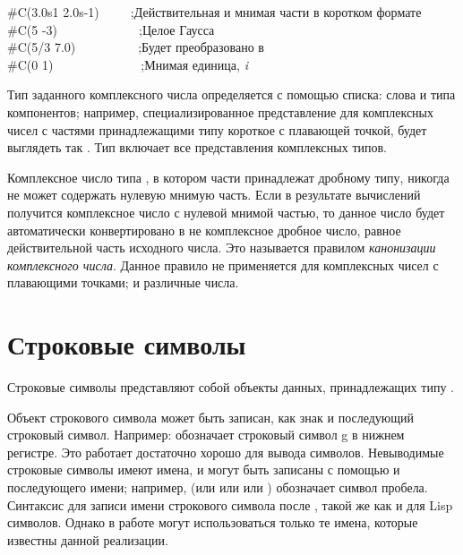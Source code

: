 \begin{lisp}
\#C(3.0s1 2.0s-1)~~~~~;\textrm{Действительная и мнимая части в коротком формате}\\
\#C(5 -3)~~~~~~~~~~~~~;\textrm{Целое Гаусса} \\
\#C(5/3 7.0)~~~~~~~~~~;\textrm{Будет преобразовано в } \\
\#C(0 1)~~~~~~~~~~~~~~;\textrm{Мнимая единица, \emph{i}}
\end{lisp}

Тип заданного комплексного числа определяется с помощью списка: слова
 и типа компонентов; например, специализированное представление для
комплексных чисел с частями принадлежащими типу короткое с плавающей точкой,
будет выглядеть так . Тип  включает все
представления комплексных типов.

Комплексное число типа , в котором части принадлежат
дробному типу, никогда не может содержать нулевую мнимую часть. Если в
результате вычислений получится комплексное число с нулевой мнимой частью, то
данное число будет автоматически конвертировано в не комплексное дробное число,
равное действительной часть исходного числа. Это называется правилом {\it
 канонизации комплексного числа}. Данное правило не применяется для комплексных
чисел с плавающими точками;  и  различные числа.

\section{Строковые символы}

Строковые символы представляют собой объекты данных, принадлежащих типу
.

Объект строкового символа может быть записан, как знак \cd{\#{\Xbackslash}} и последующий строковый символ. Например:  
обозначает строковый символ g в нижнем регистре. Это работает достаточно хорошо
для вывода символов. Невыводимые строковые символы имеют имена, и могут быть
записаны с помощью \cd{\#{\Xbackslash}} и последующего имени; например,
 (или  или
 или ) обозначает символ пробела.
Синтаксис для записи имени строкового символа после \cd{\#{\Xbackslash}}, такой
же как и для Lisp символов. Однако в работе могут использоваться только те
имена, которые известны данной реализации.

